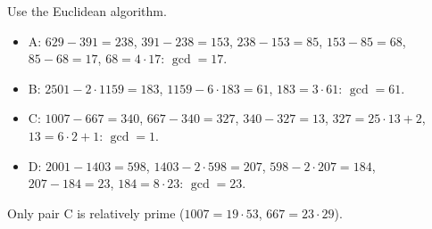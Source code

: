 Use the Euclidean algorithm.
\begin{itemize}
\item A: $629-391=238$, $391-238=153$, $238-153=85$, $153-85=68$, $85-68=17$, $68=4\cdot17$: $\gcd=17$.
\item B: $2501-2\cdot1159=183$, $1159-6\cdot183=61$, $183=3\cdot61$: $\gcd=61$.
\item C: $1007-667=340$, $667-340=327$, $340-327=13$, $327=25\cdot13+2$, $13=6\cdot2+1$: $\gcd=1$.
\item D: $2001-1403=598$, $1403-2\cdot598=207$, $598-2\cdot207=184$, $207-184=23$, $184=8\cdot23$: $\gcd=23$.
\end{itemize}
Only pair $\boxed{\text{C}}$ is relatively prime ($1007=19\cdot53$, $667=23\cdot29$).
